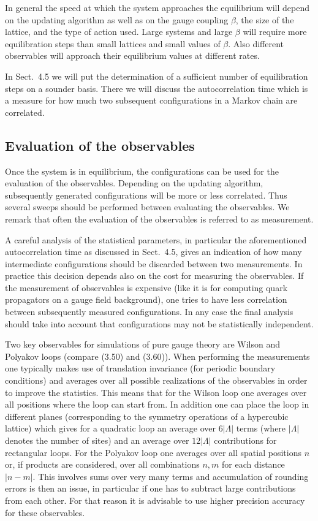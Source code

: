 In general the speed at which the system approaches the equilibrium will
depend on the updating algorithm as well as on the gauge coupling $\beta$, the
size of the lattice, and the type of action used. Large systems and large $\beta$
will require more equilibration steps than small lattices and small values of $\beta$.
Also different observables will approach their equilibrium values at different
rates.

In Sect.~4.5 we will put the determination of a sufficient number of equilibration steps on a sounder basis. There we will discuss the autocorrelation
time which is a measure for how much two subsequent configurations in a
Markov chain are correlated.

\subsection{Evaluation of the observables}

Once the system is in equilibrium, the configurations can be used for the
evaluation of the observables. Depending on the updating algorithm, subsequently generated configurations will be more or less correlated. Thus
several sweeps should be performed between evaluating the observables.
We remark that often the evaluation of the observables is referred to as
measurement.

A careful analysis of the statistical parameters, in particular the aforementioned autocorrelation time as discussed in Sect.~4.5, gives an indication
of how many intermediate configurations should be discarded between two
measurements. In practice this decision depends also on the cost for measuring the observables. If the measurement of observables is expensive (like it is
for computing quark propagators on a gauge field background), one tries to
have less correlation between subsequently measured configurations. In any
case the final analysis should take into account that configurations may not
be statistically independent.

Two key observables for simulations of pure gauge theory are Wilson and
Polyakov loops (compare (3.50) and (3.60)). When performing the measurements one typically makes use of translation invariance (for periodic boundary
conditions) and averages over all possible realizations of the observables in order to improve the statistics. This means that for the Wilson loop one averages
over all positions where the loop can start from. In addition one can place the
loop in different planes (corresponding to the symmetry operations of a hypercubic lattice) which gives for a quadratic loop an average over $6|\Lambda|$ terms
(where $|\Lambda|$ denotes the number of sites) and an average over $12|\Lambda|$ contributions for rectangular loops. For the Polyakov loop one averages over all spatial
positions $n$ or, if products are considered, over all combinations $n, m$ for each
distance $|n - m|$. This involves sums over very many terms and accumulation
of rounding errors is then an issue, in particular if one has to subtract large
contributions from each other. For that reason it is advisable to use higher
precision accuracy for these observables.

